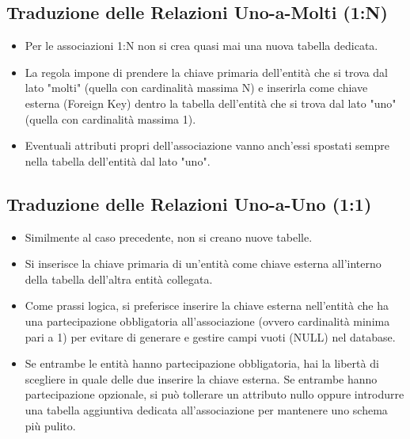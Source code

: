 \subsection{Traduzione delle Relazioni Uno-a-Molti (1:N)}
\begin{itemize}
    \item Per le associazioni 1:N non si crea quasi mai una nuova tabella dedicata.
    \item La regola impone di prendere la chiave primaria dell'entità che si trova dal lato "molti" (quella con cardinalità massima N) e inserirla come chiave esterna (Foreign Key) dentro la tabella dell'entità che si trova dal lato "uno" (quella con cardinalità massima 1).
    \item Eventuali attributi propri dell'associazione vanno anch'essi spostati sempre nella tabella dell'entità dal lato "uno".
\end{itemize}

\subsection{Traduzione delle Relazioni Uno-a-Uno (1:1)}
\begin{itemize}
    \item Similmente al caso precedente, non si creano nuove tabelle.
    \item Si inserisce la chiave primaria di un'entità come chiave esterna all'interno della tabella dell'altra entità collegata.
    \item Come prassi logica, si preferisce inserire la chiave esterna nell'entità che ha una partecipazione obbligatoria all'associazione (ovvero cardinalità minima pari a 1) per evitare di generare e gestire campi vuoti (NULL) nel database.
    \item Se entrambe le entità hanno partecipazione obbligatoria, hai la libertà di scegliere in quale delle due inserire la chiave esterna. Se entrambe hanno partecipazione opzionale, si può tollerare un attributo nullo oppure introdurre una tabella aggiuntiva dedicata all'associazione per mantenere uno schema più pulito.
\end{itemize}